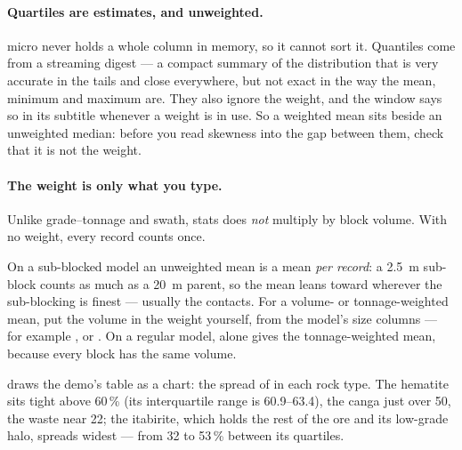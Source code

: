 \paragraph{Quartiles are estimates, and unweighted.} micro never holds a whole column in memory, so it cannot sort it. Quantiles come from a streaming digest — a compact summary of the distribution that is very accurate in the tails and close everywhere, but not exact in the way the mean, minimum and maximum are. They also ignore the weight, and the window says so in its subtitle whenever a weight is in use. So a weighted mean sits beside an unweighted median: before you read skewness into the gap between them, check that it is not the weight.

\paragraph{The weight is only what you type.} Unlike grade–tonnage and swath, stats does \emph{not} multiply by block volume. With no weight, every record counts once.

\begin{caution}
On a sub-blocked model an unweighted mean is a mean \emph{per record}: a 2.5~m sub-block counts as much as a 20~m parent, so the mean leans toward wherever the sub-blocking is finest — usually the contacts. For a volume- or tonnage-weighted mean, put the volume in the weight yourself, from the model's size columns — for example , or . On a regular model,  alone gives the tonnage-weighted mean, because every block has the same volume.
\end{caution}

 draws the demo's table as a chart: the spread of  in each rock type. The hematite sits tight above 60\,\% (its interquartile range is 60.9–63.4), the canga just over 50, the waste near 22; the itabirite, which holds the rest of the ore and its low-grade halo, spreads widest — from 32 to 53\,\% between its quartiles.

